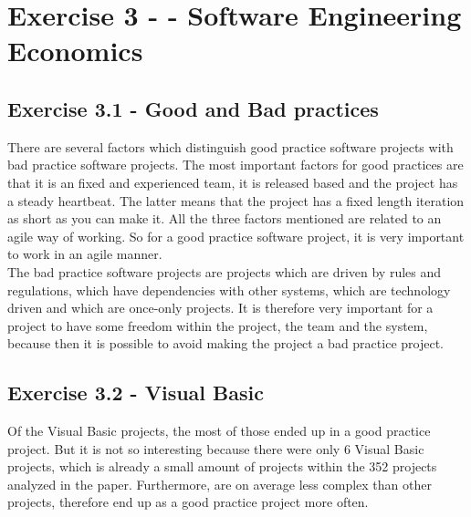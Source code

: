 \section{Exercise 3 - - Software Engineering Economics}
\subsection{Exercise 3.1 - Good and Bad practices}
There are several factors which distinguish good practice software projects with bad practice software projects. The most important factors for good practices are that it is an fixed and experienced team, it is released based and the project has a steady heartbeat. The latter means that the project has a fixed length iteration as short as you can make it. All the three factors mentioned are related to an agile way of working. So for a good practice software project, it is very important to work in an agile manner.\\
The bad practice software projects are projects which are driven by rules and regulations, which have dependencies with other systems, which are technology driven and which are once-only projects. It is therefore very important for a project to have some freedom within the project, the team and the system, because then it is possible to avoid making the project a bad practice project. 

\subsection{Exercise 3.2 - Visual Basic}
Of the Visual Basic projects, the most of those ended up in a good practice project. But it is not so interesting because there were only 6 Visual Basic projects, which is already a small amount of projects within the 352 projects analyzed in the paper. Furthermore, are on average less complex than other projects, therefore end up as a good practice project more often. 

